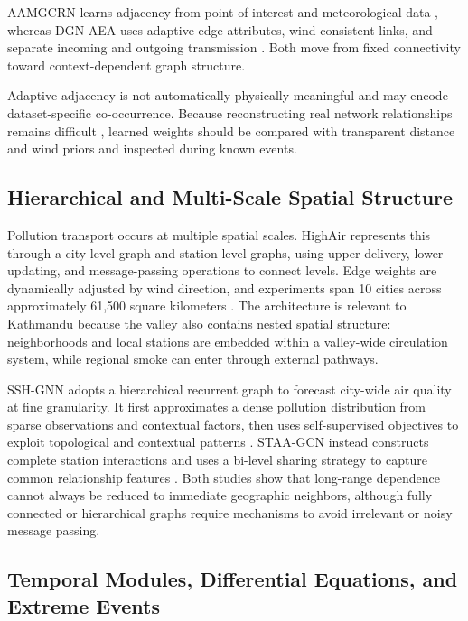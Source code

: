 AAMGCRN learns adjacency from point-of-interest and meteorological data \cite{ref16}, whereas DGN-AEA uses adaptive edge attributes, wind-consistent links, and separate incoming and outgoing transmission \cite{ref17}. Both move from fixed connectivity toward context-dependent graph structure.

Adaptive adjacency is not automatically physically meaningful and may encode dataset-specific co-occurrence. Because reconstructing real network relationships remains difficult \cite{ref17}, learned weights should be compared with transparent distance and wind priors and inspected during known events.

\subsection{Hierarchical and Multi-Scale Spatial Structure}

Pollution transport occurs at multiple spatial scales. HighAir represents this through a city-level graph and station-level graphs, using upper-delivery, lower-updating, and message-passing operations to connect levels. Edge weights are dynamically adjusted by wind direction, and experiments span 10 cities across approximately 61,500 square kilometers \cite{ref25}. The architecture is relevant to Kathmandu because the valley also contains nested spatial structure: neighborhoods and local stations are embedded within a valley-wide circulation system, while regional smoke can enter through external pathways.

SSH-GNN adopts a hierarchical recurrent graph to forecast city-wide air quality at fine granularity. It first approximates a dense pollution distribution from sparse observations and contextual factors, then uses self-supervised objectives to exploit topological and contextual patterns \cite{ref30}. STAA-GCN instead constructs complete station interactions and uses a bi-level sharing strategy to capture common relationship features \cite{ref34}. Both studies show that long-range dependence cannot always be reduced to immediate geographic neighbors, although fully connected or hierarchical graphs require mechanisms to avoid irrelevant or noisy message passing.

\subsection{Temporal Modules, Differential Equations, and Extreme Events}

